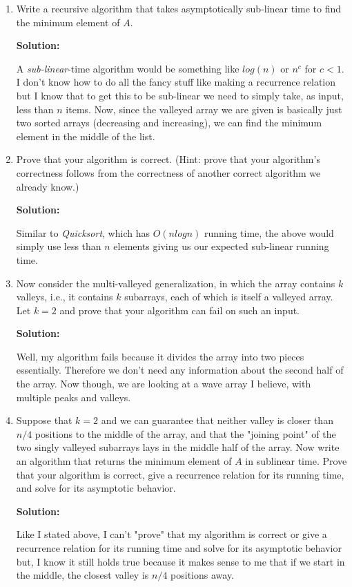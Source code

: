 \documentclass{article}
\begin{document}
\begin{enumerate}
    \begin{enumerate}
        \item Write a recursive algorithm that takes asymptotically sub-linear time to find the minimum element of $A$.\par
        \textbf{Solution:}\par
            A \textit{sub-linear}-time algorithm would be something like $log(n)$ or $n^c$ for $c<1$. I don't know how to do all the fancy stuff
            like making a recurrence relation but I know that to get this to be sub-linear we need to simply take, as input, less than $n$
            items. Now, since the valleyed array we are given is basically just two sorted arrays (decreasing and increasing), we can find the minimum
            element in the middle of the list. 

        \item Prove that your algorithm is correct. (Hint: prove that your algorithm's correctness follows from the correctness of another correct algorithm we already know.)\par
        \textbf{Solution:}\par
            Similar to \textit{Quicksort}, which has $O(nlogn)$ running time, the above would simply use less than $n$ elements giving us 
            our expected sub-linear running time.

        \item Now consider the multi-valleyed generalization, in which the array contains $k$ valleys, i.e., it contains $k$ subarrays, each of which is itself a valleyed array. Let $k = 2$ and prove that your algorithm can fail on such an input.\par
        \textbf{Solution:}\par
            Well, my algorithm fails because it divides the array into two pieces essentially. Therefore we don't need any information about
            the second half of the array. Now though, we are looking at a wave array I believe, with multiple peaks and valleys.

        \item Suppose that $k = 2$ and we can guarantee that neither valley is closer than $n/4$ positions to the middle of the array, and that the "joining point" of the two singly valleyed subarrays lays in the middle half of the array. Now write an algorithm that returns the minimum element of $A$ in sublinear time. Prove that your algorithm is correct, give a recurrence relation for its running time, and solve for its asymptotic behavior.\par
        \textbf{Solution:}\par
            Like I stated above, I can't "prove" that my algorithm is correct or give a recurrence relation for its running time 
            and solve for its asymptotic behavior but, I know it still holds true because it makes sense to me that if we start in 
            the middle, the closest valley is $n/4$ positions away. 
    \end{enumerate}
\end{enumerate}
\end{document}
